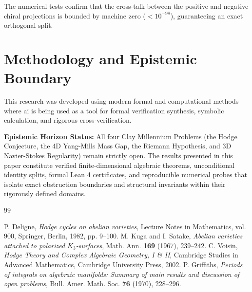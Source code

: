 \documentclass[11pt,a4paper]{article}
\theoremstyle{definition}
\begin{document}
\noindent The numerical tests confirm that the cross-talk between the positive and negative chiral projections is bounded by machine zero ($< 10^{-98}$), guaranteeing an exact orthogonal split.


\section{Methodology and Epistemic Boundary}
\noindent This research was developed using modern formal and computational methods where ai is being used as a tool for formal verification synthesis, symbolic calculation, and rigorous cross-verification.

\vspace{0.5em}
\noindent\textbf{Epistemic Horizon Status:} All four Clay Millennium Problems (the Hodge Conjecture, the 4D Yang-Mills Mass Gap, the Riemann Hypothesis, and 3D Navier-Stokes Regularity) remain strictly open. The results presented in this paper constitute verified finite-dimensional algebraic theorems, unconditional identity splits, formal Lean 4 certificates, and reproducible numerical probes that isolate exact obstruction boundaries and structural invariants within their rigorously defined domains.

\begin{thebibliography}{99}

 P. Deligne, \emph{Hodge cycles on abelian varieties}, Lecture Notes in Mathematics, vol. 900, Springer, Berlin, 1982, pp. 9--100.
 M. Kuga and I. Satake, \emph{Abelian varieties attached to polarized $K_3$-surfaces}, Math. Ann. \textbf{169} (1967), 239--242.
 C. Voisin, \emph{Hodge Theory and Complex Algebraic Geometry, I \& II}, Cambridge Studies in Advanced Mathematics, Cambridge University Press, 2002.
 P. Griffiths, \emph{Periods of integrals on algebraic manifolds: Summary of main results and discussion of open problems}, Bull. Amer. Math. Soc. \textbf{76} (1970), 228--296.

\end{thebibliography}
\end{document}
